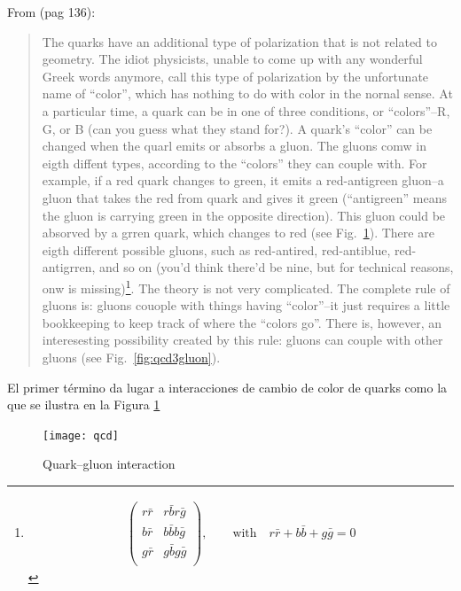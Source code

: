 
From \cite{Feynman:1986er} (pag 136):
\begin{quote}
  The quarks have an additional type of polarization that is not related to geometry. The idiot physicists, unable to come up with any wonderful Greek words anymore, call this type of polarization by the unfortunate name of ``color'', which has nothing to do with color in the nornal sense. At a particular time, a quark can be in one of three conditions, or ``colors''--R, G, or B (can you guess what they stand for?). A quark's ``color'' can be changed when the quarl emits or absorbs a gluon. The gluons comw in eigth diffent types, according to the ``colors'' they can couple with. For example, if a red quark changes to green, it emits a red-antigreen gluon--a gluon that takes the red from quark and gives it green (``antigreen'' means the gluon is carrying green in the opposite direction). This gluon could be absorved by a grren quark, which changes to red (see Fig.~\ref{fig:qcd}). There are eigth different possible gluons, such as red-antired, red-antiblue, red-antigrren, and so on (you'd think there'd be nine, but for technical reasons, onw is missing)\footnote{
    \begin{align*}
      \begin{pmatrix}
        r\bar{r} & r\bar{b} r\bar{g}\\ 
        b\bar{r} & b\bar{b} b\bar{g}\\ 
        g\bar{r} & g\bar{b} g\bar{g}\\ 
      \end{pmatrix},\qquad\text{with}\quad r\bar{r}+b\bar{b}+g\bar{g}=0
    \end{align*}
}. The theory is not very complicated.  The complete rule of gluons is: gluons couople with things having ``color''--it just requires a little bookkeeping to keep track of where the ``colors go''.  There is, however, an interesesting possibility created by this rule: gluons can couple with other gluons (see Fig.~\ref{fig:qcd3gluon}).
\end{quote}


El primer término da lugar a interacciones de cambio de color de quarks como la que se ilustra en la Figura \ref{fig:qcd}
\begin{figure}
  \centering
  \texttt{[image: qcd]} %
  \caption{Quark--gluon interaction}
  \label{fig:qcd}
\end{figure}

